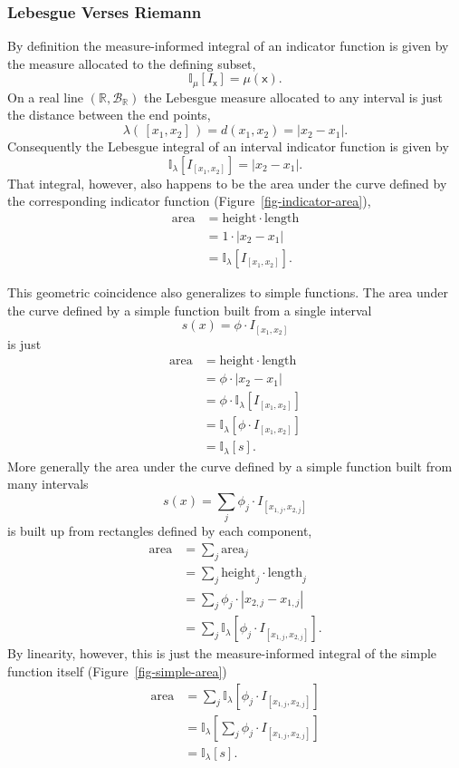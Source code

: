 \documentclass[
  letterpaper,
  DIV=11,
  numbers=noendperiod]{scrartcl}
\begin{document}
\hypertarget{lebesgue-verses-riemann}{%
\subsubsection{Lebesgue Verses Riemann}\label{lebesgue-verses-riemann}}

By definition the measure-informed integral of an indicator function is
given by the measure allocated to the defining subset, \[
\mathbb{I}_{\mu}[I_{\mathsf{x}}] = \mu(\mathsf{x}).
\] On a real line \((\mathbb{R}, \mathcal{B}_{\mathbb{R}})\) the
Lebesgue measure allocated to any interval is just the distance between
the end points, \[
\lambda( \, [x_{1}, x_{2}] \, ) = d(x_{1}, x_{2}) = | x_{2} - x_{1} |.
\] Consequently the Lebesgue integral of an interval indicator function
is given by \[
\mathbb{I}_{\lambda}[I_{[x_{1}, x_{2}]}]
=
| x_{2} - x_{1} |.
\] That integral, however, also happens to be the area under the curve
defined by the corresponding indicator function
(Figure~\ref{fig-indicator-area}), \begin{align*}
\text{area}
&= \text{height} \cdot \text{length}
\\
&= 1 \cdot | x_{2} - x_{1} |
\\
&= \mathbb{I}_{\lambda}[I_{[x_{1}, x_{2}]}].
\end{align*}

This geometric coincidence also generalizes to simple functions. The
area under the curve defined by a simple function built from a single
interval \[
s(x) = \phi \cdot I_{[x_{1}, x_{2}]}
\] is just \begin{align*}
\text{area}
&= \text{height} \cdot \text{length}
\\
&= \phi \cdot | x_{2} - x_{1} |
\\
&= \phi \cdot \mathbb{I}_{\lambda}[I_{[x_{1}, x_{2}]}]
\\
&= \mathbb{I}_{\lambda}[\phi \cdot I_{[x_{1}, x_{2}]}]
\\
&= \mathbb{I}_{\lambda}[s].
\end{align*} More generally the area under the curve defined by a simple
function built from many intervals \[
s(x) = \sum_{j} \phi_{j} \cdot I_{[x_{1, j}, x_{2, j}]}
\] is built up from rectangles defined by each component, \begin{align*}
\text{area}
&= \sum_{j} \text{area}_{j}
\\
&= \sum_{j} \text{height}_{j} \cdot \text{length}_{j}
\\
&= \sum_{j} \phi_{j} \cdot | x_{2, j} - x_{1, j} |
\\
&= \sum_{j} \mathbb{I}_{\lambda}[\phi_{j} \cdot I_{[x_{1, j}, x_{2, j}]}].
\end{align*} By linearity, however, this is just the measure-informed
integral of the simple function itself (Figure~\ref{fig-simple-area})
\begin{align*}
\text{area}
&=
\sum_{j} \mathbb{I}_{\lambda}[\phi_{j} \cdot I_{[x_{1, j}, x_{2, j}]}]
\\
&=
\mathbb{I}_{\lambda}[\sum_{j} \phi_{j} \cdot I_{[x_{1, j}, x_{2, j}]}]
\\
&= \mathbb{I}_{\lambda}[s].
\end{align*}
\end{document}
